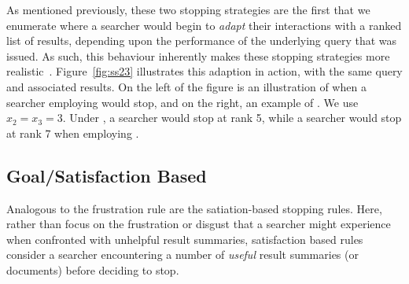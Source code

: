 As mentioned previously, these two stopping strategies are the first that we enumerate where a searcher would begin to \emph{adapt} their interactions with a ranked list of results, depending upon the performance of the underlying query that was issued. As such, this behaviour inherently makes these stopping strategies more realistic~\cite{moffat2013users_versus_models}. Figure~\ref{fig:ss23} illustrates this adaption in action, with the same query and associated results. On the left of the figure is an illustration of when a searcher employing  would stop, and on the right, an example of . We use $x_2 = x_3 = 3$. Under , a searcher would stop at rank 5, while a searcher would stop at rank 7 when employing .


\subsection{Goal/Satisfaction Based}
Analogous to the frustration rule are the satiation-based stopping rules. Here, rather than focus on the frustration or disgust that a searcher might experience when confronted with unhelpful result summaries, satisfaction based rules consider a searcher encountering a number of \emph{useful} result summaries (or documents) before deciding to stop.

